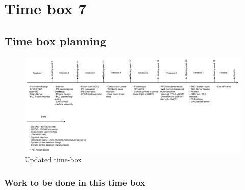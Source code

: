 \section{Time box 7}

\subsection{Time box planning}

\begin{figure}[H]
	\begin{centering}
		\includegraphics[width=1.0\textwidth]{images/tb_r7.png}
		\caption{Updated time-box}
	\end{centering}
\end{figure}

\subsubsection{Work to be done in this time box}

